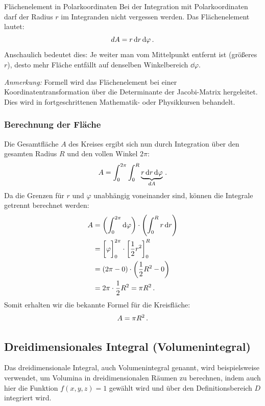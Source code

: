 \begin{rememberbox}{Flächenelement in Polarkoordinaten}
    Bei der Integration mit Polarkoordinaten darf der Radius $r$ im Integranden nicht vergessen werden. Das Flächenelement lautet:
    \begin{equation}
        dA = r \, \mathrm{d} r \, \mathrm{d} \varphi \,.
    \end{equation}
    Anschaulich bedeutet dies: Je weiter man vom Mittelpunkt entfernt ist (größeres $r$), desto mehr Fläche entfällt auf denselben Winkelbereich $\dd \varphi$.
\end{rememberbox}
\textit{Anmerkung:} Formell wird das Flächenelement bei einer Koordinatentransformation über die Determinante der Jacobi-Matrix hergeleitet. Dies wird in fortgeschrittenen Mathematik- oder Physikkursen behandelt. 
\subsubsection*{Berechnung der Fläche}
Die Gesamtfläche $A$ des Kreises ergibt sich nun durch Integration über den gesamten Radius $R$ und den vollen Winkel $2\pi$:
\begin{equation}
    A = \int_{0}^{2\pi} \int_{0}^{R} \underbrace{r \, \mathrm{d} r \, \mathrm{d} \varphi}_{dA} \,.
\end{equation}
Da die Grenzen für $r$ und $\varphi$ unabhängig voneinander sind, können die Integrale getrennt berechnet werden:
\begin{align}
    A &= \left( \int_{0}^{2\pi} \mathrm{d} \varphi \right) \cdot \left( \int_{0}^{R} r \, \mathrm{d} r \right) \\
      &= \bigg[ \varphi \bigg]_{0}^{2\pi} \cdot \bigg[ \frac{1}{2}r^2 \bigg]_{0}^{R} \\
      &= (2\pi - 0) \cdot \left( \frac{1}{2}R^2 - 0 \right) \\
      &= 2\pi \cdot \frac{1}{2}R^2 = \pi R^2 \,.
\end{align}
Somit erhalten wir die bekannte Formel für die Kreisfläche:
\begin{equation}
    A = \pi R^2 \,.
\end{equation}


\subsection{Dreidimensionales Integral (Volumenintegral)}\label{sec: Dreidimensionales_Integral}
Das dreidimensionale Integral, auch Volumenintegral genannt, wird beispielsweise verwendet, um Volumina in dreidimensionalen Räumen zu berechnen, indem auch hier die Funktion $f(x,y,z) = 1$ gewählt wird und über den Definitionsbereich $D$ integriert wird. 

